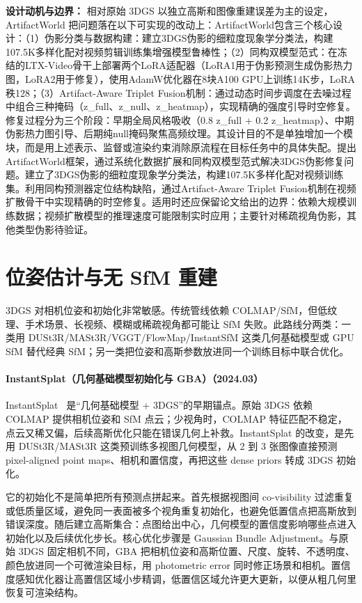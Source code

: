 \textbf{设计动机与边界：} 相对原始 3DGS 以独立高斯和图像重建误差为主的设定，ArtifactWorld 把问题落在以下可实现的改动上：ArtifactWorld包含三个核心设计：（1）伪影分类与数据构建：建立3DGS伪影的细粒度现象学分类法，构建107.5K多样化配对视频剪辑训练集增强模型鲁棒性；（2）同构双模型范式：在冻结的LTX-Video骨干上部署两个LoRA适配器（LoRA1用于伪影预测生成伪影热力图，LoRA2用于修复），使用AdamW优化器在8块A100 GPU上训练14K步，LoRA秩128；（3）Artifact-Aware Triplet Fusion机制：通过动态时间步调度在去噪过程中组合三种掩码（z\_full、z\_null、z\_heatmap），实现精确的强度引导时空修复。修复过程分为三个阶段：早期全局风格吸收（0.8 z\_full + 0.2 z\_heatmap）、中期伪影热力图引导、后期纯null掩码聚焦高频纹理。其设计目的不是单独增加一个模块，而是用上述表示、监督或渲染约束消除原流程在目标任务中的具体失配。提出ArtifactWorld框架，通过系统化数据扩展和同构双模型范式解决3DGS伪影修复问题。建立了3DGS伪影的细粒度现象学分类法，构建107.5K多样化配对视频训练集。利用同构预测器定位结构缺陷，通过Artifact-Aware Triplet Fusion机制在视频扩散骨干中实现精确的时空修复。适用时还应保留论文给出的边界：依赖大规模训练数据；视频扩散模型的推理速度可能限制实时应用；主要针对稀疏视角伪影，其他类型伪影待验证。

\section{位姿估计与无 SfM 重建}

3DGS 对相机位姿和初始化非常敏感。传统管线依赖 COLMAP/SfM，但低纹理、手术场景、长视频、模糊或稀疏视角都可能让 SfM 失败。此路线分两类：一类用 DUSt3R/MASt3R/VGGT/FlowMap/InstantSfM 这类几何基础模型或 GPU SfM 替代经典 SfM；另一类把位姿和高斯参数放进同一个训练目标中联合优化。
\paragraph{InstantSplat（几何基础模型初始化与 GBA）（2024.03）}
InstantSplat~\cite{2403_20309} 是“几何基础模型 + 3DGS”的早期锚点。原始 3DGS 依赖 COLMAP 提供相机位姿和 SfM 点云；少视角时，COLMAP 特征匹配不稳定，点云又稀又偏，后续高斯优化只能在错误几何上补救。InstantSplat 的改变，是先用 DUSt3R/MASt3R 这类预训练多视图几何模型，从 2 到 3 张图像直接预测 pixel-aligned point maps、相机和置信度，再把这些 dense priors 转成 3DGS 初始化。

它的初始化不是简单把所有预测点拼起来。首先根据视图间 co-visibility 过滤重复或低质量区域，避免同一表面被多个视角重复初始化，也避免低置信点把高斯放到错误深度。随后建立高斯集合：点图给出中心，几何模型的置信度影响哪些点进入初始化以及后续优化步长。核心优化步骤是 Gaussian Bundle Adjustment。与原始 3DGS 固定相机不同，GBA 把相机位姿和高斯位置、尺度、旋转、不透明度、颜色放进同一个可微渲染目标，用 photometric error 同时修正场景和相机。置信度感知优化器让高置信区域小步精调，低置信区域允许更大更新，以便从粗几何里恢复可渲染结构。


